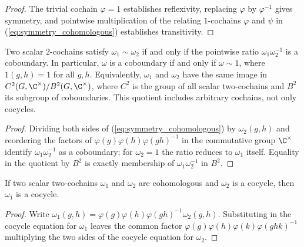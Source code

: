 \begin{proof}\leanok{}
    The trivial cochain $\varphi=1$ establishes reflexivity, replacing $\varphi$
    by $\varphi^{-1}$ gives symmetry, and pointwise multiplication of the
    relating $1$-cochains $\varphi$ and $\psi$ in
    (\ref{eq:symmetry_cohomologous}) establishes transitivity.
\end{proof}

\begin{lemma}%
    \label{thm:coboundary_iff_cohomologous_one}
    \leanok
    Two scalar $2$-cochains satisfy $\omega_1\sim\omega_2$ if and only if
    the pointwise ratio $\omega_1\omega_2^{-1}$ is a coboundary. In
    particular, $\omega$ is a coboundary if and only if $\omega \sim 1$,
    where $1(g,h)=1$ for all $g,h$.
    Equivalently, $\omega_1$ and $\omega_2$ have the same image in
    $C^2(G,\C^\times)/B^2(G,\C^\times)$, where $C^2$ is the group of all
    scalar two-cochains and $B^2$ its subgroup of coboundaries. This quotient
    includes arbitrary cochains, not only cocycles.
\end{lemma}

\begin{proof}\leanok{}
    Dividing both sides of (\ref{eq:symmetry_cohomologous}) by
    $\omega_2(g,h)$ and reordering the factors of
    $\varphi(g)\varphi(h)\varphi(gh)^{-1}$ in the commutative group
    $\C^\times$ identify $\omega_1\omega_2^{-1}$ as a coboundary; for
    $\omega_2=1$ the ratio reduces to $\omega_1$ itself.
    Equality in the quotient by $B^2$ is exactly membership of
    $\omega_1\omega_2^{-1}$ in $B^2$.
\end{proof}

\begin{lemma}%
    \label{thm:cochain_coboundary_preserves_cocycle}
    \leanok
    If two scalar two-cochains $\omega_1$ and $\omega_2$ are
    cohomologous and $\omega_2$ is a cocycle, then $\omega_1$ is a cocycle.
\end{lemma}

\begin{proof}\leanok{}
    Write $\omega_1(g,h)=\varphi(g)\varphi(h)\varphi(gh)^{-1}\omega_2(g,h)$.
    Substituting in the cocycle equation for $\omega_1$ leaves the common
    factor $\varphi(g)\varphi(h)\varphi(k)\varphi(ghk)^{-1}$ multiplying
    the two sides of the cocycle equation for $\omega_2$.
\end{proof}

